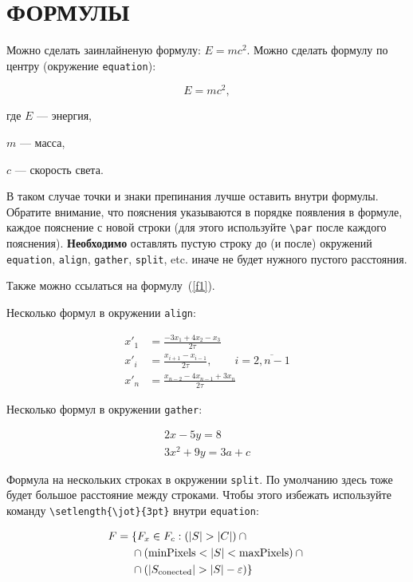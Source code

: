 \section{ФОРМУЛЫ}

Можно сделать заинлайненую формулу: $E = mc^2$. Можно сделать формулу по центру (окружение \texttt{equation}):

\begin{equation}
    \label{f1}
    E = mc^2,
\end{equation}

где $E$ --- энергия,\par $m$ --- масса,\par $c$ --- скорость света.

В таком случае точки и знаки препинания лучше оставить внутри формулы. Обратите внимание, что пояснения указываются в порядке появления в формуле, каждое пояснение с новой строки (для этого используйте \texttt{\textbackslash par} после каждого пояснения). \textbf{Необходимо} оставлять пустую строку до (и после) окружений \texttt{equation}, \texttt{align}, \texttt{gather}, \texttt{split}, etc. иначе не будет нужного пустого расстояния.  

Также можно ссылаться на формулу~(\ref{f1}).

Несколько формул в окружении \texttt{align}:

\begin{align}
x'_1 &= \frac{-3 x_1 + 4 x_2 - x_3}{2 \tau} \\
x'_i &= \frac{x_{i+1} - x_{i-1}}{2 \tau}, \qquad i = \overline{2, n-1} \\
x'_n &= \frac{x_{n-2} - 4 x_{n-1} + 3 x_n}{2 \tau}
\end{align}

Несколько формул в окружении \texttt{gather}:

\begin{gather} 
2x - 5y =  8 \\ 
3x^2 + 9y =  3a + c
\end{gather}

Формула на нескольких строках в окружении \texttt{split}. По умолчанию здесь тоже будет большое расстояние между строками. Чтобы этого избежать используйте команду \texttt{\textbackslash setlength\{\textbackslash jot\}\{3pt\}} внутри \texttt{equation}:

\begin{equation}
\setlength{\jot}{3pt}
\begin{split}
F = {} &\{F_{x} \in  F_{c} : (|S| > |C|) \cap {} \\
& \cap (\mathrm{minPixels}  < |S| < \mathrm{maxPixels}) \cap {} \\
& \cap (|S_{\mathrm{conected}}| > |S| - \varepsilon) \}
\end{split}
\end{equation}